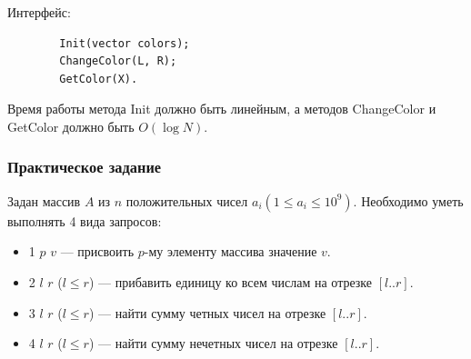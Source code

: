 Интерфейс:
\begin{verbatim}
        Init(vector colors);
        ChangeColor(L, R);
        GetColor(X).
\end{verbatim}

Время работы метода Init должно быть линейным, а методов ChangeColor и GetColor должно быть $O(\log N)$.

\subsubsection{Практическое задание}
Задан массив $A$ из $n$ положительных чисел $a_{i} (1 \le a_{i} \le 10^9)$. Необходимо уметь выполнять 4 вида запросов:
\begin{itemize}
    \item 1 $p$ $v$ — присвоить $p$-му элементу массива значение $v$.
    \item 2 $l$ $r$ ($l \le r$) — прибавить единицу ко всем числам на отрезке $[l..r]$.
    \item 3 $l$ $r$ ($l \le r$) — найти сумму четных чисел на отрезке $[l..r]$.
    \item 4 $l$ $r$ ($l \le r$) — найти сумму нечетных чисел на отрезке $[l..r]$.
\end{itemize}
